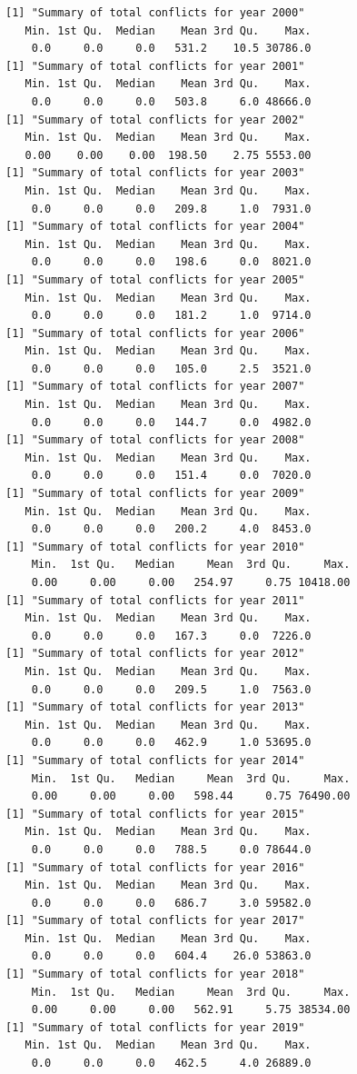 \documentclass[
  11pt,
  letterpaper,
  DIV=11,
  numbers=noendperiod]{scrartcl}
\begin{document}
\begin{verbatim}
[1] "Summary of total conflicts for year 2000"
   Min. 1st Qu.  Median    Mean 3rd Qu.    Max. 
    0.0     0.0     0.0   531.2    10.5 30786.0 
[1] "Summary of total conflicts for year 2001"
   Min. 1st Qu.  Median    Mean 3rd Qu.    Max. 
    0.0     0.0     0.0   503.8     6.0 48666.0 
[1] "Summary of total conflicts for year 2002"
   Min. 1st Qu.  Median    Mean 3rd Qu.    Max. 
   0.00    0.00    0.00  198.50    2.75 5553.00 
[1] "Summary of total conflicts for year 2003"
   Min. 1st Qu.  Median    Mean 3rd Qu.    Max. 
    0.0     0.0     0.0   209.8     1.0  7931.0 
[1] "Summary of total conflicts for year 2004"
   Min. 1st Qu.  Median    Mean 3rd Qu.    Max. 
    0.0     0.0     0.0   198.6     0.0  8021.0 
[1] "Summary of total conflicts for year 2005"
   Min. 1st Qu.  Median    Mean 3rd Qu.    Max. 
    0.0     0.0     0.0   181.2     1.0  9714.0 
[1] "Summary of total conflicts for year 2006"
   Min. 1st Qu.  Median    Mean 3rd Qu.    Max. 
    0.0     0.0     0.0   105.0     2.5  3521.0 
[1] "Summary of total conflicts for year 2007"
   Min. 1st Qu.  Median    Mean 3rd Qu.    Max. 
    0.0     0.0     0.0   144.7     0.0  4982.0 
[1] "Summary of total conflicts for year 2008"
   Min. 1st Qu.  Median    Mean 3rd Qu.    Max. 
    0.0     0.0     0.0   151.4     0.0  7020.0 
[1] "Summary of total conflicts for year 2009"
   Min. 1st Qu.  Median    Mean 3rd Qu.    Max. 
    0.0     0.0     0.0   200.2     4.0  8453.0 
[1] "Summary of total conflicts for year 2010"
    Min.  1st Qu.   Median     Mean  3rd Qu.     Max. 
    0.00     0.00     0.00   254.97     0.75 10418.00 
[1] "Summary of total conflicts for year 2011"
   Min. 1st Qu.  Median    Mean 3rd Qu.    Max. 
    0.0     0.0     0.0   167.3     0.0  7226.0 
[1] "Summary of total conflicts for year 2012"
   Min. 1st Qu.  Median    Mean 3rd Qu.    Max. 
    0.0     0.0     0.0   209.5     1.0  7563.0 
[1] "Summary of total conflicts for year 2013"
   Min. 1st Qu.  Median    Mean 3rd Qu.    Max. 
    0.0     0.0     0.0   462.9     1.0 53695.0 
[1] "Summary of total conflicts for year 2014"
    Min.  1st Qu.   Median     Mean  3rd Qu.     Max. 
    0.00     0.00     0.00   598.44     0.75 76490.00 
[1] "Summary of total conflicts for year 2015"
   Min. 1st Qu.  Median    Mean 3rd Qu.    Max. 
    0.0     0.0     0.0   788.5     0.0 78644.0 
[1] "Summary of total conflicts for year 2016"
   Min. 1st Qu.  Median    Mean 3rd Qu.    Max. 
    0.0     0.0     0.0   686.7     3.0 59582.0 
[1] "Summary of total conflicts for year 2017"
   Min. 1st Qu.  Median    Mean 3rd Qu.    Max. 
    0.0     0.0     0.0   604.4    26.0 53863.0 
[1] "Summary of total conflicts for year 2018"
    Min.  1st Qu.   Median     Mean  3rd Qu.     Max. 
    0.00     0.00     0.00   562.91     5.75 38534.00 
[1] "Summary of total conflicts for year 2019"
   Min. 1st Qu.  Median    Mean 3rd Qu.    Max. 
    0.0     0.0     0.0   462.5     4.0 26889.0 
\end{verbatim}
\end{document}

